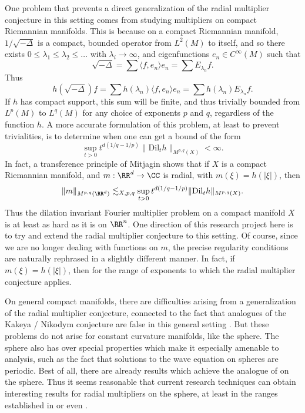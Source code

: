 One problem that prevents a direct generalization of the radial multiplier conjecture in this setting comes from studying multipliers on compact Riemannian manifolds. This is because on a compact Riemannian manifold, $1 / \sqrt{-\Delta}$ is a compact, bounded operator from $L^2(M)$ to itself, and so there exists $0 \leq \lambda_1 \leq \lambda_2 \leq \dots$ with $\lambda_i \to \infty$, and eigenfunctions $e_n \in C^\infty(M)$ such that
%
\[ \sqrt{-\Delta} = \sum \langle f, e_n \rangle e_n = \sum E_{\lambda_n} f. \]
%
Thus
%
\[ h \left( \sqrt{-\Delta} \right) f = \sum h(\lambda_n) \langle f, e_n \rangle e_n = \sum h(\lambda_n) E_{\lambda_n} f. \]
%
If $h$ has compact support, this sum will be finite, and thus trivially bounded from $L^p(M)$ to $L^q(M)$ for any choice of exponents $p$ and $q$, regardless of the function $h$. A more accurate formulation of this problem, at least to prevent trivialities, is to determine when one can get a bound of the form
%
\[ \sup_{t > 0} t^{d(1/q - 1/p)} \| \text{Dil}_t h \|_{M^{p,q}(X)} < \infty. \]
%
In fact, a transference principle of Mitjagin \cite{Mitjagin} shows that if $X$ is a compact Riemannian manifold, and $m: \RR^d \to \CC$ is radial, with $m(\xi) = h(|\xi|)$, then
%
\[ \| m \|_{M^{p,q}(\RR^d)} \lesssim_{X,p,q} \sup_{t > 0} t^{d(1/q - 1/p)} \| \text{Dil}_t h \|_{M^{p,q}(X)}. \]
%
Thus the dilation invariant Fourier multiplier problem on a compact manifold $X$ is at least as hard as it is on $\RR^n$. One direction of this research project here is to try and extend the radial multiplier conjecture to this setting. Of course, since we are no longer dealing with functions on $m$, the precise regularity conditions are naturally rephrased in a slightly different manner. In fact, if $m(\xi) = h(|\xi|)$, then for the range of exponents to which the radial multiplier conjecture applies.

On general compact manifolds, there are difficulties arising from a generalization of the radial multiplier conjecture, connected to the fact that analogues of the Kakeya / Nikodym conjecture are false in this general setting \cite{Minicozzi}. But these problems do not arise for constant curvature manifolds, like the sphere. The sphere also has over special properties which make it especially amenable to analysis, such as the fact that solutions to the wave equation on spheres are periodic. Best of all, there are already results which achieve the analogue of \cite{GarrigosandSeeger} on the sphere. Thus it seems reasonable that current research techniques can obtain interesting results for radial multipliers on the sphere, at least in the ranges established in \cite{HeoandNazarovandSeeger} or even \cite{Cladek}.

